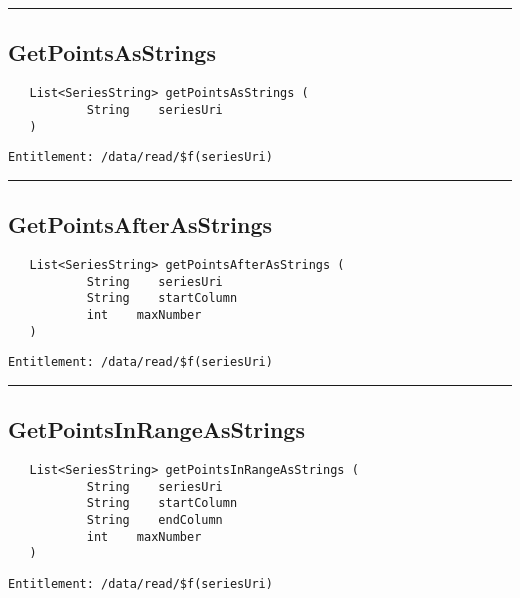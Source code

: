 \rule{12cm}{2pt}
\subsection{GetPointsAsStrings}
\label{Api:GetPointsAsStrings}
\begin{Verbatim}
   List<SeriesString> getPointsAsStrings (
           String    seriesUri
   )
\end{Verbatim}
\begin{Verbatim}[formatcom=\color{Maroon}]
  Entitlement: /data/read/$f(seriesUri)
\end{Verbatim}



\rule{12cm}{2pt}
\subsection{GetPointsAfterAsStrings}
\label{Api:GetPointsAfterAsStrings}
\begin{Verbatim}
   List<SeriesString> getPointsAfterAsStrings (
           String    seriesUri
           String    startColumn
           int    maxNumber
   )
\end{Verbatim}
\begin{Verbatim}[formatcom=\color{Maroon}]
  Entitlement: /data/read/$f(seriesUri)
\end{Verbatim}



\rule{12cm}{2pt}
\subsection{GetPointsInRangeAsStrings}
\label{Api:GetPointsInRangeAsStrings}
\begin{Verbatim}
   List<SeriesString> getPointsInRangeAsStrings (
           String    seriesUri
           String    startColumn
           String    endColumn
           int    maxNumber
   )
\end{Verbatim}
\begin{Verbatim}[formatcom=\color{Maroon}]
  Entitlement: /data/read/$f(seriesUri)
\end{Verbatim}



